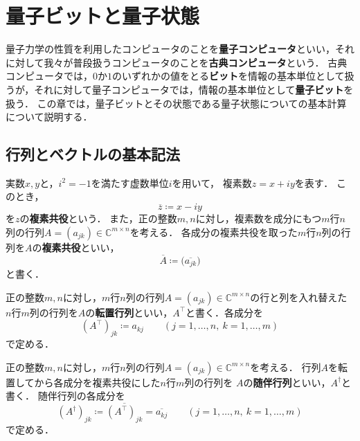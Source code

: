 \section{量子ビットと量子状態}
\label{sec:qubit-state}

量子力学の性質を利用したコンピュータのことを\textbf{量子コンピュータ}といい，それに対して我々が普段扱うコンピュータのことを\textbf{古典コンピュータ}という．
古典コンピュータでは，$0$か$1$のいずれかの値をとる\textbf{ビット}を情報の基本単位として扱うが，それに対して量子コンピュータでは，情報の基本単位として\textbf{量子ビット}を扱う．
この章では，量子ビットとその状態である量子状態についての基本計算について説明する．

\subsection{行列とベクトルの基本記法}

\begin{defi}[複素共役]
  実数$x,y$と，$i^2=-1$を満たす虚数単位$i$を用いて，
  複素数$z=x+iy$を表す．
  このとき，
  \begin{equation*}
    \overline{z}\coloneq x-iy
  \end{equation*}
  を$z$の\textbf{複素共役}という．
  また，正の整数$m,n$に対し，複素数を成分にもつ$m$行$n$列の行列$A=(a_{jk}) \in \mathbb{C}^{m\times n}$を考える．
  各成分の複素共役を取った$m$行$n$列の行列を$A$の\textbf{複素共役}といい，
  \begin{equation*}
    \overline{A}\coloneq\bigl(\overline{a_{jk}}\bigr)
  \end{equation*}
  と書く．
\end{defi}

\begin{defi}[転置]
  正の整数$m,n$に対し，$m$行$n$列の行列$A=(a_{jk}) \in \mathbb{C}^{m\times n}$の行と列を入れ替えた
  $n$行$m$列の行列を$A$の\textbf{転置行列}といい，$A^\top$と書く．各成分を
  \begin{equation*}
    (A^\top)_{jk}\coloneq a_{kj}
    \qquad (j=1,\ldots,n,\ k=1,\ldots,m)
  \end{equation*}
  で定める．
\end{defi}

\begin{defi}[随伴行列]
  正の整数$m,n$に対し，$m$行$n$列の行列$A=(a_{jk}) \in \mathbb{C}^{m\times n}$を考える．
  行列$A$を転置してから各成分を複素共役にした$n$行$m$列の行列を
  $A$の\textbf{随伴行列}といい，$A^{\dagger}$と書く．
  随伴行列の各成分を
  \begin{equation*}
    (A^{\dagger})_{jk}\coloneq\overline{(A^\top)_{jk}}=\overline{a_{kj}}
    \qquad (j=1,\ldots,n,\ k=1,\ldots,m)
  \end{equation*}
  で定める．
\end{defi}

